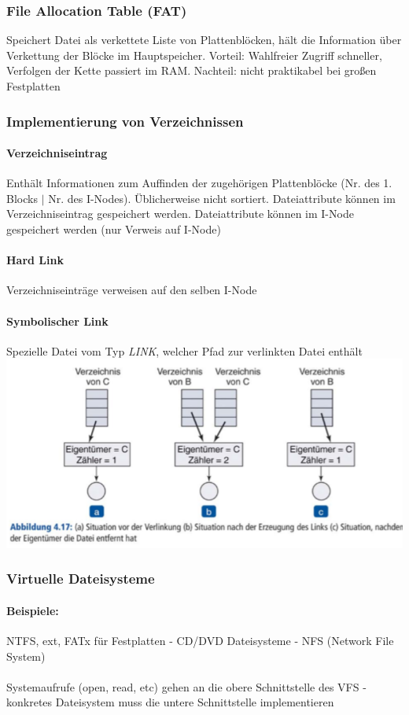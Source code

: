 \documentclass[10pt,a4paper,landscape]{article}
\begin{document}
\begin{multicols*}{3}
	\subsubsection{File Allocation Table (FAT)}
	Speichert Datei als verkettete Liste von Plattenblöcken, hält die Information über Verkettung der Blöcke im Hauptspeicher. Vorteil: Wahlfreier Zugriff schneller, Verfolgen der Kette passiert im RAM. Nachteil: nicht praktikabel bei großen Festplatten
	\subsubsection{Implementierung von Verzeichnissen}
	\paragraph{Verzeichniseintrag} Enthält Informationen zum Auffinden der zugehörigen Plattenblöcke (Nr. des 1. Blocks $\vert$ Nr. des I-Nodes). Üblicherweise nicht sortiert. Dateiattribute können im Verzeichniseintrag gespeichert werden. Dateiattribute können im I-Node gespeichert werden (nur Verweis auf I-Node)
	\paragraph{Hard Link} Verzeichniseinträge verweisen auf den selben I-Node
	\paragraph{Symbolischer Link} Spezielle Datei vom Typ \textit{LINK}, welcher Pfad zur verlinkten Datei enthält\\
	\includegraphics[width=0.8\columnwidth]{link}
	\subsubsection{Virtuelle Dateisysteme}
	\paragraph{Beispiele:} NTFS, ext, FATx für Festplatten - CD/DVD Dateisysteme - NFS (Network File System)\\\\
	Systemaufrufe (open, read, etc) gehen an die obere Schnittstelle des VFS - konkretes Dateisystem muss die untere Schnittstelle implementieren

\end{multicols*}
\end{document}
